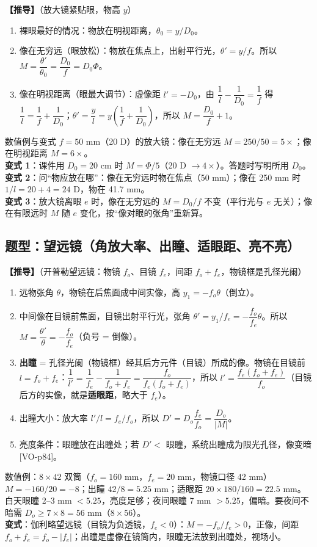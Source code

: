 \textbf{【推导】}（放大镜紧贴眼，物高 $y$）
\begin{enumerate}
\item 裸眼最好的情况：物放在明视距离，$\theta_0=y/D_0$。
\item 像在无穷远（眼放松）：物放在焦点上，出射平行光，$\theta'=y/f$。所以 $M=\dfrac{\theta'}{\theta_0}=\dfrac{D_0}{f}=D_0\Phi$。
\item 像在明视距离（眼最大调节）：虚像距 $l'=-D_0$，由 $\dfrac1l-\dfrac1{D_0}=\dfrac1f$ 得 $\dfrac1l=\dfrac1f+\dfrac1{D_0}$；$\theta'=\dfrac yl=y\left(\dfrac1f+\dfrac1{D_0}\right)$，所以 $M=\dfrac{D_0}f+1$。
\end{enumerate}
\begin{exam}{数值例与变式}
$f=50$ mm（20 D）的放大镜：像在无穷远 $M=250/50=5\times$；像在明视距离 $M=6\times$。\\
\textbf{变式 1}：课件用 $D_0=20$ cm 时 $M=\Phi/5$（20 D $\to4\times$）。答题时写明所用 $D_0$。\\
\textbf{变式 2}：问“物应放在哪”：像在无穷远时物在焦点（50 mm）；像在 250 mm 时 $1/l=20+4=24$ D，物在 41.7 mm。\\
\textbf{变式 3}：放大镜离眼 $e$ 时，像在无穷远的 $M=D_0/f$ 不变（平行光与 $e$ 无关）；像在有限远时 $M$ 随 $e$ 变化，按“像对眼的张角”重新算。
\end{exam}

\subsection{题型：望远镜（角放大率、出瞳、适眼距、亮不亮）}\label{sec:telescope}
\textbf{【推导】}（开普勒望远镜：物镜 $f_o$、目镜 $f_e$，间距 $f_o+f_e$，物镜框是孔径光阑）
\begin{enumerate}
\item 远物张角 $\theta$，物镜在后焦面成中间实像，高 $y_1=-f_o\theta$（倒立）。
\item 中间像在目镜前焦面，目镜出射平行光，张角 $\theta'=y_1/f_e=-\dfrac{f_o}{f_e}\theta$。所以 $M=\dfrac{\theta'}{\theta}=-\dfrac{f_o}{f_e}$（负号 = 倒像）。
\item \textbf{出瞳} = 孔径光阑（物镜框）经其后方元件（目镜）所成的像。物镜在目镜前 $l=f_o+f_e$：$\dfrac1{l'}=\dfrac1{f_e}-\dfrac1{f_o+f_e}=\dfrac{f_o}{f_e(f_o+f_e)}$，所以 $l'=\dfrac{f_e(f_o+f_e)}{f_o}$（目镜后方的实像，就是\textbf{适眼距}，略大于 $f_e$）。
\item 出瞳大小：放大率 $l'/l=f_e/f_o$，所以 $D'=D_o\dfrac{f_e}{f_o}=\dfrac{D_o}{|M|}$。
\item 亮度条件：眼瞳放在出瞳处；若 $D'<$ 眼瞳，系统出瞳成为限光孔径，像变暗 [VO-p84]。
\end{enumerate}
\begin{exam}{数值例：$8\times42$ 双筒（$f_o=160$ mm，$f_e=20$ mm，物镜口径 42 mm）}
$M=-160/20=-8$；出瞳 $42/8=5.25$ mm；适眼距 $20\times180/160=22.5$ mm。
白天眼瞳 2–3 mm $<5.25$，亮度足够；夜间眼瞳 7 mm $>5.25$，偏暗。要夜间不暗需 $D_o\ge7\times8=56$ mm（$8\times56$）。\\
\textbf{变式}：伽利略望远镜（目镜为负透镜，$f_e<0$）：$M=-f_o/f_e>0$，正像，间距 $f_o+f_e=f_o-|f_e|$；出瞳是虚像在镜筒内，眼瞳无法放到出瞳处，视场小。
\end{exam}

